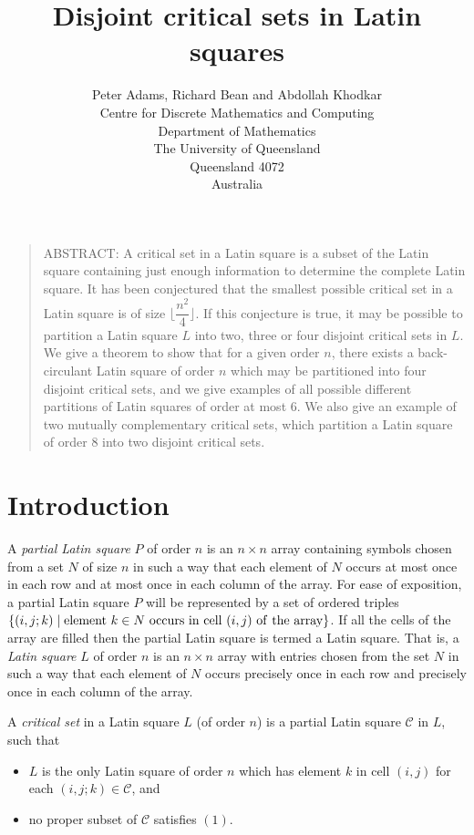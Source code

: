 \documentclass[11pt]{article}
\title{Disjoint critical sets in Latin squares}
\author{Peter Adams, Richard Bean and Abdollah Khodkar \\
Centre for Discrete Mathematics and Computing \\ 
Department of Mathematics\\ 
The University of Queensland\\ 
Queensland 4072\\ Australia}
\date{ }
\begin{document}
\maketitle

\vspace{15 pt}

\begin{quote}
ABSTRACT:
A critical set in a Latin square is a subset of the Latin square
containing just enough information to determine the complete Latin
square.  It has been conjectured that the smallest possible
critical set in a Latin square is of size $\lfloor \dfrac{n^2}{4} \rfloor$.
If this conjecture is true, it may be possible to partition
a Latin square $L$ into two, three or four disjoint critical sets
in $L$.  We give a theorem to show that for a given order $n$,
there exists a back-circulant Latin square of order $n$ which
may be partitioned into four disjoint critical sets, and we give
examples of all possible different partitions of Latin squares
of order at most 6.  We also give an example of two mutually
complementary critical sets, which partition a Latin square of
order 8 into two disjoint critical sets.

\end{quote}
\vspace{8mm}


\section{Introduction}   

A {\em partial Latin square} $P$ of order $n$ is an $n\times n$ array 
containing symbols chosen from a set $N$ of size $n$
in such a way that each element of $N$
occurs at most once in each row and at most once in each column of the array.
For ease of exposition, a partial Latin square $P$ will be represented by 
a set of ordered triples $\{(i,j;k)\mid {\rm element\ }
k\in N {\rm \ occurs \ in\ cell\ } (i,j) {\rm \ of\ the\ array}\}$.
If all the cells of the array are filled then the partial Latin square 
is termed a Latin square. 
That is, a {\em Latin square} $L$ of order $n$ is an $n\times n$ array with
entries chosen from the set $N$ in such a way that 
each element of $N$ occurs precisely once in each
row and precisely once in each column of the array.

A {\it critical set} in a Latin square $L$ (of order $n$) is a
partial Latin square ${\mathcal C}$ in $L$, such that
\begin{itemize}
\item[(1)] $L$ is the only Latin square of order $n$ which has
element $k$ in cell $(i,j)$ for each $(i,j;k)\in {\mathcal C}$, and

\item[(2)] no proper subset of ${\mathcal C}$ satisfies $(1)$.
\end{itemize}
\end{document}
